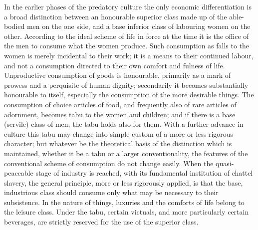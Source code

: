 \documentclass[12pt]{report}
\begin{document}
In the earlier phases of the predatory culture the only economic
differentiation is a broad distinction between an honourable superior
class made up of the able-bodied men on the one side, and a base
inferior class of labouring women on the other. According to the ideal
scheme of life in force at the time it is the office of the men to
consume what the women produce. Such consumption as falls to the women
is merely incidental to their work; it is a means to their continued
labour, and not a consumption directed to their own comfort and fulness
of life. Unproductive consumption of goods is honourable, primarily as
a mark of prowess and a perquisite of human dignity; secondarily it
becomes substantially honourable to itself, especially the consumption
of the more desirable things. The consumption of choice articles of
food, and frequently also of rare articles of adornment, becomes tabu to
the women and children; and if there is a base (servile) class of men,
the tabu holds also for them. With a further advance in culture this
tabu may change into simple custom of a more or less rigorous character;
but whatever be the theoretical basis of the distinction which is
maintained, whether it be a tabu or a larger conventionality, the
features of the conventional scheme of consumption do not change
easily. When the quasi-peaceable stage of industry is reached, with its
fundamental institution of chattel slavery, the general principle, more
or less rigorously applied, is that the base, industrious class should
consume only what may be necessary to their subsistence. In the nature
of things, luxuries and the comforts of life belong to the leisure
class. Under the tabu, certain victuals, and more particularly certain
beverages, are strictly reserved for the use of the superior class.
\end{document}
